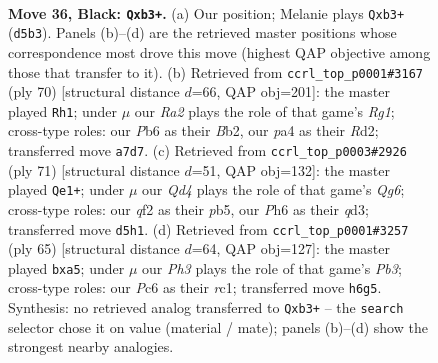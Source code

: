 \documentclass[11pt]{article}
\begin{document}
\clearpage

\begin{figure}[p]\centering
\begin{subfigure}{0.46\textwidth}\centering
\resizebox{\linewidth}{!}{%
\newchessgame
\chessboard[
  setfen={7r/r3k3/1pp1p1pp/3q2P1/Pp1P4/1P1KP3/R4Q2/2B5 b - - 0 36},
  showmover=false,
  pgfstyle=straightmove, color=movearrow, markmove={d5-b3}
]}
\caption{}
\end{subfigure}\hfill
\begin{subfigure}{0.46\textwidth}\centering
\resizebox{\linewidth}{!}{%
\newchessgame
\chessboard[
  setfen={5r2/3p1r2/2q1p2k/P1p1P3/1pQ1p2b/1P2P3/1B1R1PK1/6R1 w - - 0 36},
  showmover=false,
  pgfstyle=straightmove, color=movearrow, markmove={g1-h1}
]}
\caption{}
\end{subfigure}
\\[4pt]
\begin{subfigure}{0.46\textwidth}\centering
\resizebox{\linewidth}{!}{%
\newchessgame
\chessboard[
  setfen={4r1k1/p4p2/1p4p1/1PpP3p/2P5/2RQP1qP/6P1/6K1 b - - 2 36},
  showmover=false,
  pgfstyle=straightmove, color=movearrow, markmove={g3-e1}
]}
\caption{}
\end{subfigure}\hfill
\begin{subfigure}{0.46\textwidth}\centering
\resizebox{\linewidth}{!}{%
\newchessgame
\chessboard[
  setfen={r5k1/5pp1/pp1r4/P5q1/1PRPp3/4P3/4Q1P1/2R3K1 b - - 0 33},
  showmover=false,
  pgfstyle=straightmove, color=movearrow, markmove={b6-a5}
]}
\caption{}
\end{subfigure}
\caption{\textbf{Move 36, Black: \texttt{Qxb3+}.} (a) Our position; Melanie plays \texttt{Qxb3+} (\texttt{d5b3}). Panels (b)--(d) are the retrieved master positions whose correspondence most drove this move (highest QAP objective among those that transfer to it). (b) Retrieved from \texttt{ccrl\_top\_p0001\#3167} (ply 70) [structural distance $d$=66, QAP obj=201]: the master played \texttt{Rh1}; under $\mu$ our \emph{Ra2} plays the role of that game's \emph{Rg1}; cross-type roles: our \emph{P}b6 as their \emph{B}b2, our \emph{p}a4 as their \emph{R}d2; transferred move \texttt{a7d7}. (c) Retrieved from \texttt{ccrl\_top\_p0003\#2926} (ply 71) [structural distance $d$=51, QAP obj=132]: the master played \texttt{Qe1+}; under $\mu$ our \emph{Qd4} plays the role of that game's \emph{Qg6}; cross-type roles: our \emph{q}f2 as their \emph{p}b5, our \emph{P}h6 as their \emph{q}d3; transferred move \texttt{d5h1}. (d) Retrieved from \texttt{ccrl\_top\_p0001\#3257} (ply 65) [structural distance $d$=64, QAP obj=127]: the master played \texttt{bxa5}; under $\mu$ our \emph{Ph3} plays the role of that game's \emph{Pb3}; cross-type roles: our \emph{P}c6 as their \emph{r}c1; transferred move \texttt{h6g5}. Synthesis: no retrieved analog transferred to \texttt{Qxb3+} -- the \texttt{search} selector chose it on value (material / mate); panels (b)--(d) show the strongest nearby analogies.}
\label{fig:thought-m71}
\end{figure}
\end{document}
